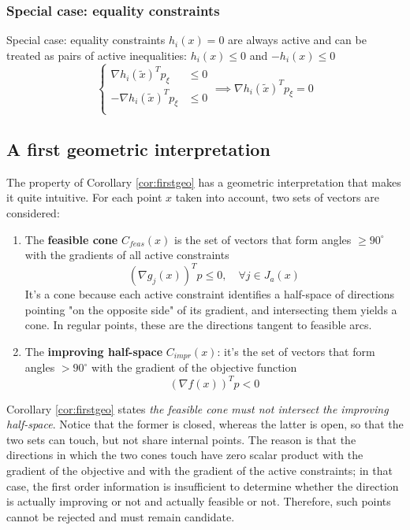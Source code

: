 \subsubsection{Special case: equality constraints}
\label{subsub:equalityconstraintsreplaced}
Special case: equality constraints $h_i (x) = 0$ are always active and can be treated as pairs of active inequalities: $h_i (x) \leq 0$ and $-h_i (x) \leq 0$
$$
\begin{cases}
	\nabla h_i (\tilde x)^T p_\xi & \leq 0 \\
	- \nabla h_i (\tilde x)^T p_\xi & \leq 0 \\
\end{cases}
\implies \nabla h_i (\tilde x)^T p_\xi = 0
$$


\subsection{A first geometric interpretation}
\label{subsec:firstgeometricinterpretation}

The property of Corollary \ref{cor:firstgeo} has a geometric interpretation that makes it quite intuitive. For each point $x$ taken into account, two sets of vectors are considered: 
\begin{enumerate}
	\item The \textbf{feasible cone} $C_{feas} (x)$ is the set of vectors that form angles $\geq 90^\circ$ with the gradients of all active constraints
	$$ (\nabla g_j (x))^T p \leq 0, \quad \forall j \in J_a (x) $$
	It's a cone because each active constraint identifies a half-space of directions pointing "on the opposite side" of its gradient, and intersecting them yields a cone. In regular points, these are the directions tangent to feasible arcs.
	
	\item The \textbf{improving half-space} $C_{impr} (x)$: it's the set of vectors that form angles $> 90^\circ$ with the gradient of the objective function
	$$ (\nabla f(x))^T p < 0 $$
\end{enumerate}

Corollary \ref{cor:firstgeo} states \textit{the feasible cone must not intersect the improving half-space}. Notice that the former is closed, whereas the latter is open, so that the two sets can touch, but not share internal points. The reason is that the directions in which the two cones touch have zero scalar product with the gradient of the objective and with the gradient of the active constraints; in that case, the first order information is insufficient to determine whether the direction is actually improving or not and actually feasible or not. Therefore, such points cannot be rejected and must remain candidate.


